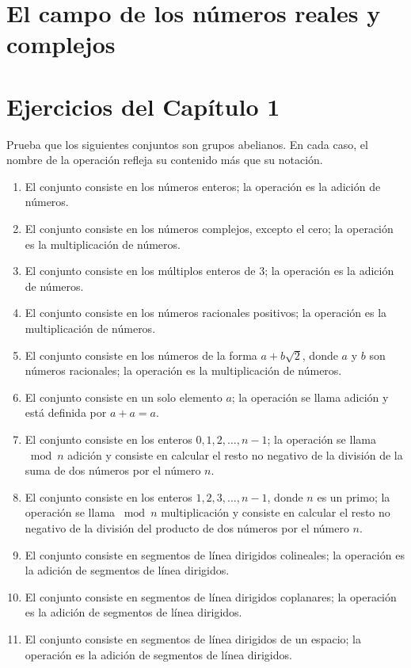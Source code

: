\section{El campo de los números reales y complejos}

\newpage

\section{Ejercicios del Capítulo 1}

\noindent Prueba que los siguientes conjuntos son grupos abelianos. En cada caso, el nombre de la operación refleja su contenido más que su notación.
\begin{enumerate}
    \item El conjunto consiste en los números enteros; la operación es la adición de números.
    \item El conjunto consiste en los números complejos, excepto el cero; la operación es la multiplicación de números.
    \item El conjunto consiste en los múltiplos enteros de 3; la operación es la adición de números.
    \item El conjunto consiste en los números racionales positivos; la operación es la multiplicación de números.
    \item El conjunto consiste en los números de la forma $a + b\sqrt{2}$, donde $a$ y $b$ son números racionales; la operación es la multiplicación de números.
    \item El conjunto consiste en un solo elemento $a$; la operación se llama adición y está definida por $a + a = a$.
    \item El conjunto consiste en los enteros $0, 1, 2, \dots, n - 1$; la operación se llama $\bmod n$ adición y consiste en calcular el resto no negativo de la división de la suma de dos números por el número $n$.
    \item El conjunto consiste en los enteros $1, 2, 3, \dots, n - 1$, donde $n$ es un primo; la operación se llama $\bmod n$ multiplicación y consiste en calcular el resto no negativo de la división del producto de dos números por el número $n$.
    \item El conjunto consiste en segmentos de línea dirigidos colineales; la operación es la adición de segmentos de línea dirigidos.
    \item El conjunto consiste en segmentos de línea dirigidos coplanares; la operación es la adición de segmentos de línea dirigidos.
    \item El conjunto consiste en segmentos de línea dirigidos de un espacio; la operación es la adición de segmentos de línea dirigidos.
\end{enumerate}
